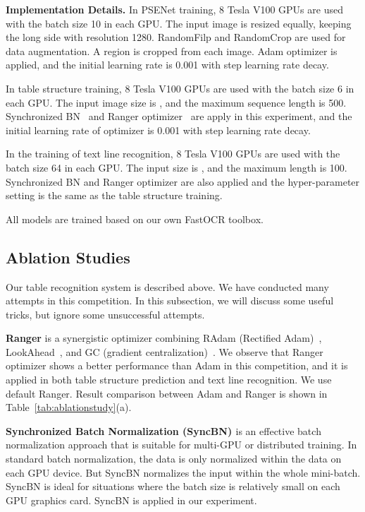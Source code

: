 \documentclass{article}
\begin{document}
{\bf{Implementation Details.}} In PSENet training, 8 Tesla V100 GPUs are used with the batch size 10 in each GPU. The input image is resized equally, keeping the long side with resolution 1280. RandomFilp and RandomCrop are used for data augmentation. A  region is cropped from each image. 
Adam optimizer is applied, and the initial learning rate is 0.001 with step learning rate decay.

In table structure training, 8 Tesla V100 GPUs are used with the batch size 6 in each GPU. The input image size is , and the maximum sequence length is 500. Synchronized BN~\cite{zhang2018context} and Ranger optimizer~\cite{lessw2019ranger} are apply in this experiment, and the initial learning rate of optimizer is 0.001 with step learning rate decay.

In the training of text line recognition, 8 Tesla V100 GPUs are used with the batch size 64 in each GPU. The input size is , and the maximum length is 100. Synchronized BN and Ranger optimizer are also applied and the hyper-parameter setting is the same as the table structure training. 

All models are trained based on our own FastOCR toolbox.

\subsection{Ablation Studies}
Our table recognition system is described above. We have conducted many attempts in this competition. In this subsection, we will discuss some useful tricks, but ignore some unsuccessful attempts.


{\bf{Ranger}} is a synergistic optimizer combining RAdam (Rectified Adam)~\cite{liu2019radam}, LookAhead~\cite{zhang2019lookahead}, and GC (gradient centralization)~\cite{yong2020gradient}. We observe  that Ranger optimizer shows a better performance than Adam in this competition, and it is applied in both table structure prediction and text line recognition. We use default Ranger.
Result comparison between Adam and Ranger is shown in Table~\ref{tab:ablationstudy}(a).


{\bf{Synchronized Batch Normalization (SyncBN) }} is an effective batch normalization approach that is suitable for multi-GPU or distributed training. In standard batch normalization, the data is only normalized within the data on each GPU device. But SyncBN normalizes the input within the whole mini-batch. SyncBN is ideal for situations where the batch size is relatively small on each GPU graphics card.
SyncBN is applied in our experiment.
\end{document}
